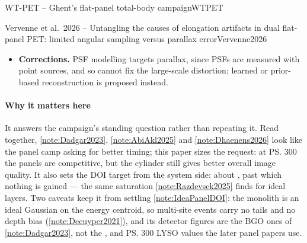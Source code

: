 \begin{programnote}{WT-PET -- Ghent's flat-panel total-body campaign}{WTPET}
\begin{papernote}{Vervenne et al.\ 2026 -- Untangling the causes of elongation artifacts in dual flat-panel PET: limited angular sampling versus parallax error}{Vervenne2026}
\begin{itemize}
		detector from BGO to LYSO, doubting that BGO's \ps{327} holds at system
		level.
	\item \textbf{Corrections.} PSF modelling targets parallax, since PSFs are
		measured with point sources, and so cannot fix the large-scale
		distortion; learned or prior-based reconstruction is proposed instead.
\end{itemize}

\paragraph{Why it matters here}
It answers the campaign's standing question rather than repeating it. Read
together, \ref{note:Dadgar2023}, \ref{note:AbiAkl2025} and
\ref{note:Dhaenens2026} look like the panel camp asking for better timing; this
paper sizes the request: at \ps{300} the panels are competitive, but the
cylinder still gives better overall image quality. It also
sets the DOI target from the system side: about , past which nothing is
gained --- the same saturation \ref{note:Razdevsek2025} finds for ideal layers.
Two caveats keep it from settling \ref{note:IdeaPanelDOI}: the monolith is an
ideal Gaussian on the energy centroid, so multi-site events carry no tails and
no depth bias (\ref{note:Decuyper2021}), and its detector figures are the BGO
ones of \ref{note:Dadgar2023}, not the ,  and \ps{300} LYSO
values the later panel papers use.

\end{papernote}

\end{programnote}
 
 
 
